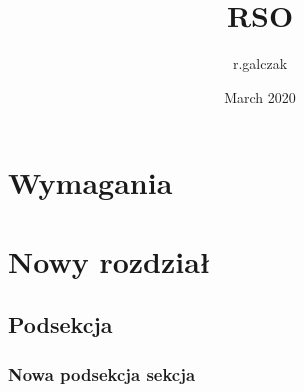 \documentclass{report}
\title{RSO}
\author{r.galczak}
\date{March 2020}
\begin{document}
\maketitle

\chapter{Wymagania}




\chapter*{Nowy rozdział}

\section{Podsekcja}

\subsection{Nowa podsekcja sekcja}
\end{document}
